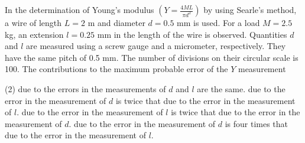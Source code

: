
\item In the determination of Young's modulus $\left( Y = \frac{4ML}{\pi d^2} \right)$ by using Searle's method, a wire of length $L = 2$ m and diameter $d = 0.5$ mm is used. For a load $M = 2.5$ kg, an extension $l = 0.25$ mm in the length of the wire is observed. Quantities $d$ and $l$ are measured using a screw gauge and a micrometer, respectively. They have the same pitch of 0.5 mm. The number of divisions on their circular scale is 100. The contributions to the maximum probable error of the $Y$ measurement

\begin{tasks}(2)
\task due to the errors in the measurements of $d$ and $l$ are the same.
\task due to the error in the measurement of $d$ is twice that due to the error in the measurement of $l$.
\task due to the error in the measurement of $l$ is twice that due to the error in the measurement of $d$.
\task due to the error in the measurement of $d$ is four times that due to the error in the measurement of $l$.
\end{tasks}

